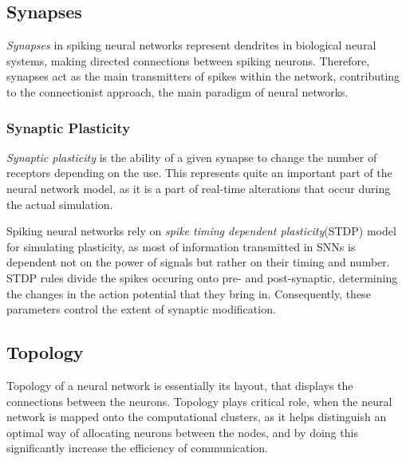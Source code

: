 \subsection{Synapses}

\emph{Synapses} in spiking neural networks represent dendrites in biological neural systems, making directed connections between spiking neurons. 
Therefore, synapses act as the main transmitters of spikes within the network, contributing to the connectionist approach, the main paradigm of neural networks.

\subsubsection{Synaptic Plasticity}

\emph{Synaptic plasticity} is the ability of a given synapse to change the number of receptors depending on the use.\cite{WulframGerstner2002} This represents quite an
important part of the neural network model, as it is a part of real-time alterations that occur during the actual simulation.

Spiking neural networks rely on \emph{spike timing dependent plasticity}(STDP) model for simulating plasticity, as most of information transmitted in SNNs is dependent not on 
the power of signals but rather on their timing and number. STDP rules divide the spikes occuring onto pre- and post-synaptic, determining the changes in the action potential that
they bring in. Consequently, these parameters control the extent of synaptic modification.\cite{SenSong2000}

\subsection{Topology}

Topology of a neural network is essentially its layout, that displays the connections between the neurons. Topology plays critical role, when 
the neural network is mapped onto the computational clusters, as it helps distinguish an optimal way of allocating neurons between the nodes,
and by doing this significantly increase the efficiency of communication.

